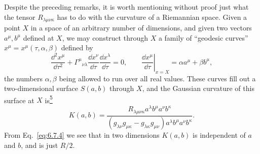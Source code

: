 Despite the preceding remarks, it is worth mentioning without proof just what
the tensor \(R_{\lambda\mu\nu\kappa}\) has to do with the curvature of a
Riemannian space. Given a point \(X\) in a space of an arbitrary number of
dimensions, and given two vectors \(a^\mu,b^\mu\) defined at \(X\), we may
construct through \(X\) a family of ``geodesic curves''
\(x^\mu=x^\mu(\tau,\alpha,\beta)\) defined by
\[
  \frac{\dd^2x^\mu}{\dd\tau^2}
  +\Gamma^\mu{}_{\nu\lambda}
   \frac{\dd x^\nu}{\dd\tau}
   \frac{\dd x^\lambda}{\dd\tau}
  =0,
  \qquad
  \left.\frac{\dd x^\mu}{\dd\tau}\right|_{x=X}
  =
  \alpha a^\mu+\beta b^\mu,
\]
the numbers \(\alpha,\beta\) being allowed to run over all real values. These
curves fill out a two-dimensional surface \(S(a,b)\) through \(X\), and the
Gaussian curvature of this surface at \(X\)
is\hyperref[ch6-ref-5]{\textsuperscript{5}}
\begin{equation}
  K(a,b)
  =
  \frac{
    R_{\lambda\mu\nu\kappa}
    a^\lambda b^\mu a^\nu b^\kappa
  }{
    (g_{\lambda\nu}g_{\mu\kappa}
     -g_{\lambda\kappa}g_{\mu\nu})
    a^\lambda b^\mu a^\nu b^\kappa
  }.
  \tag{6.9.1}\label{eq:6.9.1}
\end{equation}
From Eq.~\eqref{eq:6.7.4} we see that in two dimensions \(K(a,b)\) is
independent of \(a\) and \(b\), and is just \(R/2\).

